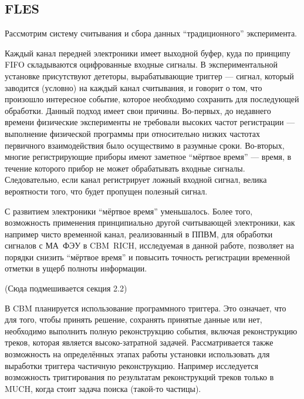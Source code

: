 \subsection{FLES}\label{sec:secFLES}

Рассмотрим систему считывания и сбора данных ``традиционного'' эксперимента.


Каждый канал передней электроники имеет выходной буфер, куда по принципу FIFO складываются оцифрованные входные сигналы. В экспериментальной установке присутствуют дететоры, вырабатывающие триггер --- сигнал, который заводится (условно) на каждый канал считывания, и говорит о том, что произошло интересное событие, которое необходимо сохранить для последующей обработки. Данный подход имеет свои причины. Во-первых, до недавнего времени физические эксперименты не требовали высоких частот регистрации --- выполнение физической программы при относительно низких частотах первичного взаимодействия было осуществимо в разумные сроки. Во-вторых, многие регистрирующие приборы имеют заметное ``мёртвое время'' --- время, в течение которого прибор не может обрабатывать входные сигналы. Следовательно, если канал регистрирует ложный входной сигнал, велика вероятности того, что будет пропущен полезный сигнал.

С развитием электроники ``мёртвое время'' уменьшалось. Более того, возможность применения принципиально другой считывающей электроники, как например чисто временной канал, реализованный в ППВМ, для обработки сигналов с МА~ФЭУ в CBM~RICH, исследуемая в данной работе, позволяет на порядки снизить ``мёртвое время'' и повысить точность регистрации временной отметки в ущерб полноты информации.

(Сюда подмешивается секция 2.2)

В CBM планируется использование программного триггера. Это означает, что для того, чтобы принять решение, сохранять принятые данные или нет, необходимо выполнить полную реконструкцию события, включая реконструкцию треков, которая является высоко-затратной задачей. Рассматривается также возможность на определённых этапах работы установки использовать для выработки триггера частичную реконструкцию. Например исследуется возможность триггирования по результатам реконструкций треков только в MUCH, когда стоит задача поиска (такой-то частицы).

